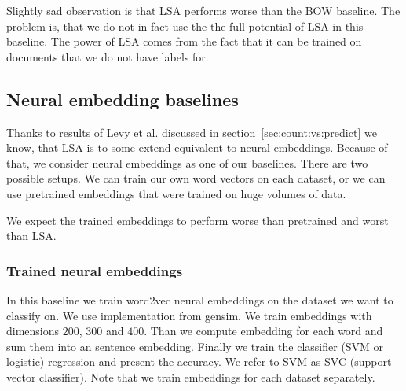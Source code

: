     Slightly sad observation is that LSA performs worse than the BOW baseline. 
    The problem is, that we do not in fact use the the full potential of LSA in this baseline.
    The power of LSA comes from the fact that it can be trained on documents that we do not have labels for.

    \subsection{Neural embedding baselines}
    
    Thanks to results of Levy et al.\cite{levy2014neural} discussed in section~\ref{sec:count:vs:predict} we know, that LSA is to some extend equivalent to neural embeddings.
    Because of that, we consider neural embeddings as one of our baselines.
    There are two possible setups.
    We can train our own word vectors on each dataset, or we can use pretrained embeddings that were trained on huge volumes of data.
    
    We expect the trained embeddings to perform worse than pretrained and worst than LSA.
    
    \subsubsection{Trained neural embeddings}
    In this baseline we train word2vec neural embeddings on the dataset we want to classify on. 
    We use implementation  from gensim.
    We train embeddings with dimensions $200$, $300$ and $400$. 
    Than we compute embedding for each word and sum them into an sentence embedding.
    Finally we train the classifier (SVM or logistic) regression and present the accuracy.
    We refer to SVM as SVC (support vector classifier).
    Note that we train embeddings for each dataset separately.

